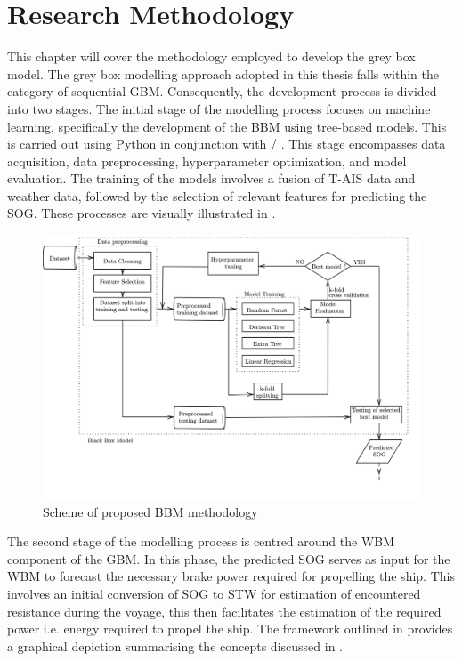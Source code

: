 \chapter{Research Methodology} \label{chp:method}

This chapter will cover the methodology employed to develop the grey box model. The grey box modelling approach adopted in this thesis falls within the category of sequential GBM. Consequently, the development process is divided into two stages. The initial stage of the modelling process focuses on machine learning, specifically the development of the BBM using tree-based models. This is carried out using Python in conjunction with \scikit/ . This stage encompasses data acquisition, data preprocessing, hyperparameter optimization, and model evaluation. The training of the models involves a fusion of T-AIS data and weather data, followed by the selection of relevant features for predicting the SOG. These processes are visually illustrated in .

\begin{figure}[h]
    \centering
        \includegraphics[width=\textwidth]{02_figures/flowmethod_BBM_alt.png}
        \caption{Scheme of proposed BBM methodology}
        \label{fig:flowchart_BBM}
\end{figure}

The second stage of the modelling process is centred around the WBM component of the GBM. In this phase, the predicted SOG serves as input for the WBM to forecast the necessary brake power required for propelling the ship. This involves an initial conversion of SOG to STW for estimation of encountered resistance during the voyage, this then facilitates the estimation of the required power i.e. energy required to propel the ship. The framework outlined in  provides a graphical depiction summarising the concepts discussed in .

